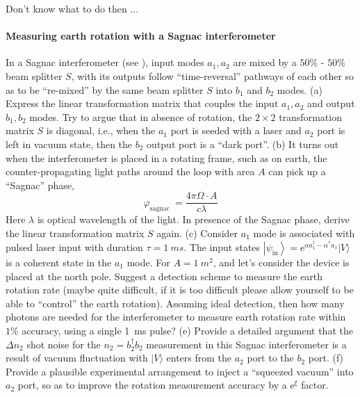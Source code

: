 \documentclass[hyperref, a4paper]{article}
\newcommand*{\ee}{\mathrm{e}}
\begin{document}
Don't know what to do then ...

\paragraph{}

\paragraph{Measuring earth rotation with a Sagnac interferometer} In a Sagnac interferometer (see ), input modes ${a}_{1}, {a}_{2}$ are mixed by a $50 \%$ - $50 \%$ beam splitter $S$, with its outputs follow ``time-reversal'' pathways of each other so as to be ``re-mixed'' by the same beam splitter $S$ into ${b}_{1}$ and ${b}_{2}$ modes.
(a) Express the linear transformation matrix that couples the input $a_{1}, a_{2}$ and output ${b}_{1}, {b}_{2}$ modes. Try to argue that in absence of rotation, the $2 \times 2$ transformation matrix ${S}$ is diagonal, i.e., when the $a_1$ port is seeded with a laser and $a_2$ port is left in vacuum state, then the $b_2$ output port is a ``dark port''.
(b) It turns out when the interferometer is placed in a rotating frame, such as on earth, the counter-propagating light paths around the loop with area $A$ can pick up a ``Sagnac'' phase,
\[
\varphi_{\text {sagnac }}=\frac{4 \pi \Omega \cdot A}{c \lambda}
\]
Here $\lambda$ is optical wavelength of the light. In presence of the Sagnac phase, derive the linear transformation matrix ${S}$ again.
(c) Consider $a_{1}$ mode is associated with pulsed laser input with duration $\tau=\SI{1}{ms}$.
The input states $\left|\psi_{\text{in}}\right\rangle=\ee^{\alpha a_{1}^{\dagger}-\alpha^{*} a_{1}}|V\rangle$ is a coherent state in the $a_{1}$ mode. For ${A}=\SI{1}{m^2}$, and let's consider the device is placed at the north pole. Suggest a detection scheme to measure the earth rotation rate (maybe quite difficult, if it is too difficult please allow yourself to be able to ``control'' the earth rotation). Assuming ideal detection, then how many photons are needed for the interferometer to measure earth rotation rate within $1 \%$ accuracy, using a single \SI{1}{ms} pulse?
(e) Provide a detailed argument that the $\Delta {n}_{2}$ shot noise for the ${n}_{2}=b_{2}^{\dagger} b_{2}$ measurement in this Sagnac interferometer is a result of vacuum fluctuation with $|V\rangle$ enters from the $a_{2}$ port to the $b_{2}$ port.
(f) Provide a plausible experimental arrangement to inject a ``squeezed vacuum'' into $a_{2}$ port, so as to improve the rotation measurement accuracy by a $\mathrm{e}^{\xi}$ factor.
\end{document}

